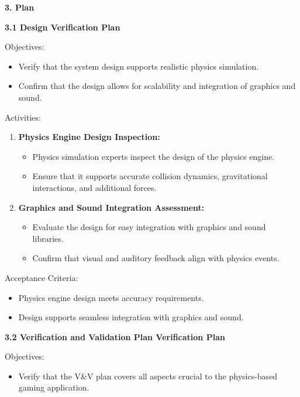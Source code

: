 \documentclass[
]{article}
\begin{document}
\textbf{3. Plan}

\textbf{3.1 Design Verification Plan}

Objectives:

\begin{itemize}
\item
  Verify that the system design supports realistic physics simulation.
\item
  Confirm that the design allows for scalability and integration of
  graphics and sound.
\end{itemize}

Activities:

\begin{enumerate}
\def\labelenumi{\arabic{enumi}.}
\item
  \textbf{Physics Engine Design Inspection:}

  \begin{itemize}
  \item
    Physics simulation experts inspect the design of the physics engine.
  \item
    Ensure that it supports accurate collision dynamics, gravitational
    interactions, and additional forces.
  \end{itemize}
\item
  \textbf{Graphics and Sound Integration Assessment:}

  \begin{itemize}
  \item
    Evaluate the design for easy integration with graphics and sound
    libraries.
  \item
    Confirm that visual and auditory feedback align with physics events.
  \end{itemize}
\end{enumerate}

Acceptance Criteria:

\begin{itemize}
\item
  Physics engine design meets accuracy requirements.
\item
  Design supports seamless integration with graphics and sound.
\end{itemize}

\textbf{3.2 Verification and Validation Plan Verification Plan}

Objectives:

\begin{itemize}
\item
  Verify that the V\&V plan covers all aspects crucial to the
  physics-based gaming application.
\end{itemize}
\end{document}
